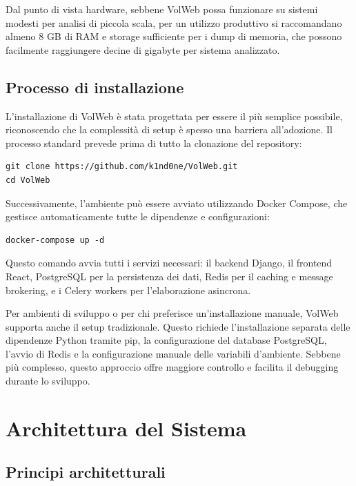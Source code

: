Dal punto di vista hardware, sebbene VolWeb possa funzionare su sistemi modesti per analisi di piccola scala, per un utilizzo produttivo si raccomandano almeno 8 GB di RAM e storage sufficiente per i dump di memoria, che possono facilmente raggiungere decine di gigabyte per sistema analizzato.

\subsection{Processo di installazione}

L'installazione di VolWeb è stata progettata per essere il più semplice possibile, riconoscendo che la complessità di setup è spesso una barriera all'adozione. Il processo standard prevede prima di tutto la clonazione del repository:

\begin{verbatim}
git clone https://github.com/k1nd0ne/VolWeb.git
cd VolWeb
\end{verbatim}

Successivamente, l'ambiente può essere avviato utilizzando Docker Compose, che gestisce automaticamente tutte le dipendenze e configurazioni:

\begin{verbatim}
docker-compose up -d
\end{verbatim}

Questo comando avvia tutti i servizi necessari: il backend Django, il frontend React, PostgreSQL per la persistenza dei dati, Redis per il caching e message brokering, e i Celery workers per l'elaborazione asincrona.

Per ambienti di sviluppo o per chi preferisce un'installazione manuale, VolWeb supporta anche il setup tradizionale. Questo richiede l'installazione separata delle dipendenze Python tramite pip, la configurazione del database PostgreSQL, l'avvio di Redis e la configurazione manuale delle variabili d'ambiente. Sebbene più complesso, questo approccio offre maggiore controllo e facilita il debugging durante lo sviluppo.

\section{Architettura del Sistema}

\subsection{Principi architetturali}

